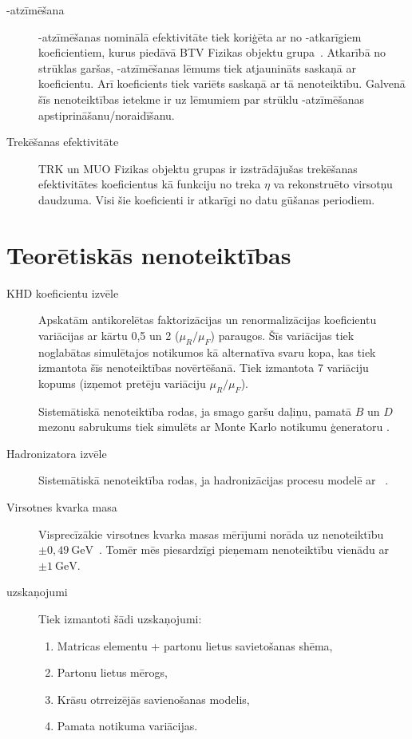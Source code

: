 \begin{description}
\item[\cPqb-atzīmēšana] \cPqb-atzīmēšanas nominālā efektivitāte tiek koriģēta ar no \pt-atkarīgiem koeficientiem, kurus piedāvā BTV Fizikas objektu grupa~\cite{twiki:BTV}. Atkarībā no strūklas garšas, \cPqb-atzīmēšanas lēmums tiek atjaunināts saskaņā ar koeficientu. Arī koeficients tiek variēts saskaņā ar tā nenoteiktību. Galvenā šīs nenoteiktības ietekme ir uz lēmumiem par strūklu \cPqb-atzīmēšanas apstiprināšanu/noraidīšanu.
  
\item[Trekēšanas efektivitāte] TRK un MUO Fizikas objektu grupas ir izstrādājušas trekēšanas efektivitātes koeficientus kā funkciju no treka $\eta$ va rekonstruēto virsotņu daudzuma. Visi šie koeficienti ir atkarīgi no datu gūšanas periodiem.
\end{description}

\section{Teorētiskās nenoteiktības}
\begin{description}
\item[KHD koeficientu izvēle] Apskatām antikorelētas faktorizācijas un renormalizācijas koeficientu variācijas ar kārtu 0,5 un 2 ($\mu_R/\mu_F$) \ttbar paraugos. Šīs variācijas tiek noglabātas simulētajos notikumos kā alternatīva svaru kopa, kas tiek izmantota šīs nenoteiktības novērtēšanā. Tiek izmantota 7 variāciju kopums (izņemot pretēju variāciju $\mu_R/\mu_F$).

\item[\EVTGEN] Sistemātiskā nenoteiktība rodas, ja smago garšu daļiņu, pamatā $B$ un $D$ mezonu sabrukums tiek simulēts ar Monte Karlo notikumu ģeneratoru \EVTGEN.

\item[Hadronizatora izvēle] Sistemātiskā nenoteiktība rodas, ja hadronizācijas procesu modelē ar \HERWIGpp~\cite{Bahr:2008pv}. 

\item[Virsotnes kvarka masa] Visprecīzākie virsotnes kvarka masas mērījumi norāda uz nenoteiktību $\pm0,49~\text{GeV}$~\cite{Khachatryan:2015hba}. Tomēr mēs piesardzīgi pieņemam nenoteiktību vienādu ar $\pm1~\text{GeV}$. 

\item[\PYTHIA uzskaņojumi] Tiek izmantoti šādi \PYTHIA uzskaņojumi:
  \begin{enumerate}
  \item Matricas elementu + partonu lietus savietošanas shēma,
  \item Partonu lietus mērogs,
  \item Krāsu otrreizējās savienošanas modelis,
  \item Pamata notikuma variācijas.
  \end{enumerate}
\end{description}

